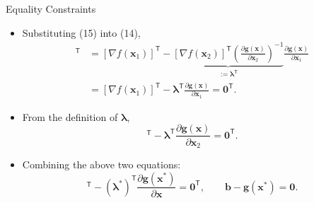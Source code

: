 \documentclass[aspectratio=169,hyperref,UTF8,CJK]{beamer}
\newcommand{\trans}{\mathsf{T}}
\newcommand{\vect}[1]{\boldsymbol{#1}}
\begin{document}
\begin{frame}{Equality Constraints}
  \scriptsize
  \begin{itemize}
    \item Substituting (15) into (14),
      \begin{align*}
        [\nabla\widetilde f(\vect{x}_1)]^{\trans}
        &=[\nabla f(\vect{x}_1)]^{\trans}-
        \underbrace{[\nabla f(\vect{x}_2)]^{\trans}
        \left(\frac{\partial\vect{g}(\vect{x})}{\partial\vect{x}_2}\right)^{-1}}_{:=\vect{\lambda}^{\trans}}
        \frac{\partial\vect{g}(\vect{x})}{\partial\vect{x}_1}\\
        &=[\nabla f(\vect{x}_1)]^{\trans}-
        \vect{\lambda}^{\trans}\frac{\partial\vect{g}(\vect{x})}{\partial\vect{x}_1}=\vect{0}^{\trans}.
      \end{align*}
    \item From the definition of $\vect{\lambda}$,
      \begin{equation*}
        [\nabla f(\vect{x}_2)]^{\trans}-
        \vect{\lambda}^{\trans}\frac{\partial\vect{g}(\vect{x})}{\partial\vect{x}_2}=\vect{0}^{\trans}.
      \end{equation*}
    \item Combining the above two equations:
      \begin{equation*}
        [\nabla f(\vect{x}^{*})]^{\trans}-(\vect{\lambda}^{*})^{\trans}
        \frac{\partial\vect{g}(\vect{x}^{*})}{\partial\vect{x}}=\vect{0}^{\trans},
        \qquad
        \vect{b}-\vect{g}(\vect{x}^{*})=\vect{0}.
      \end{equation*}
  \end{itemize}
\end{frame}
\end{document}
